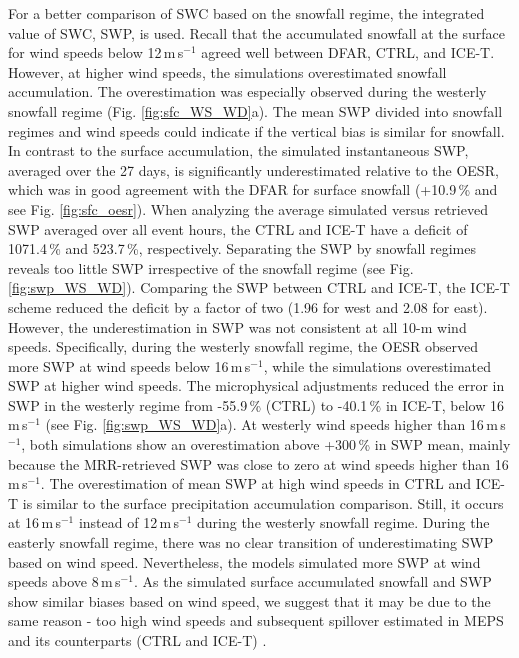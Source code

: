\documentclass{ametsocV5}
\begin{document}
		For a better comparison of SWC based on the snowfall regime, the integrated value of SWC, SWP, is used. Recall that the accumulated snowfall at the surface for wind speeds below 12\,m\,s$^{-1}$ agreed well between DFAR, CTRL, and ICE-T. However, at higher wind speeds, the simulations overestimated snowfall accumulation. The overestimation was especially observed during the westerly snowfall regime (Fig. \ref{fig:sfc_WS_WD}a). The mean SWP divided into snowfall regimes and wind speeds could indicate if the vertical bias is similar for snowfall. In contrast to the surface accumulation, the simulated instantaneous SWP, averaged over the 27 days, is significantly underestimated relative to the OESR, which was in good agreement with the DFAR for surface snowfall (+10.9\,\% and see Fig. \ref{fig:sfc_oesr}). When analyzing the average simulated versus retrieved SWP averaged over all event hours, the CTRL and ICE-T have a deficit of 1071.4\,\% and 523.7\,\%, respectively. Separating the SWP by snowfall regimes reveals too little SWP irrespective of the snowfall regime (see Fig. \ref{fig:swp_WS_WD}). Comparing the SWP between CTRL and ICE-T, the ICE-T scheme reduced the deficit by a factor of two (1.96 for west and 2.08 for east). However, the underestimation in SWP was not consistent at all 10-m wind speeds. Specifically, during the westerly snowfall regime, the OESR observed more SWP at wind speeds below 16\,m\,s$^{-1}$, while the simulations overestimated SWP at higher wind speeds. The microphysical adjustments reduced the error in SWP in the westerly regime from -55.9\,\% (CTRL) to -40.1\,\% in ICE-T, below 16\,m\,s$^{-1}$ (see Fig. \ref{fig:swp_WS_WD}a). At westerly wind speeds higher than 16\,m\,s$^{-1}$, both simulations show an overestimation above +300\,\% in SWP mean, mainly because the MRR-retrieved SWP was close to zero at wind speeds higher than 16\,m\,s$^{-1}$. The overestimation of mean SWP at high wind speeds in CTRL and ICE-T is similar to the surface precipitation accumulation comparison. Still, it occurs at 16\,m\,s$^{-1}$ instead of 12\,m\,s$^{-1}$ during the westerly snowfall regime. During the easterly snowfall regime, there was no clear transition of underestimating SWP based on wind speed. Nevertheless, the models simulated more SWP at wind speeds above 8\,m\,s$^{-1}$. As the simulated surface accumulated snowfall and SWP show similar biases based on wind speed, we suggest that it may be due to the same reason - too high wind speeds and subsequent spillover estimated in MEPS and its counterparts (CTRL and ICE-T) \citep{muller_arome-metcoop:_2017,frogner_convection-permitting_2019}. 
\end{document}

